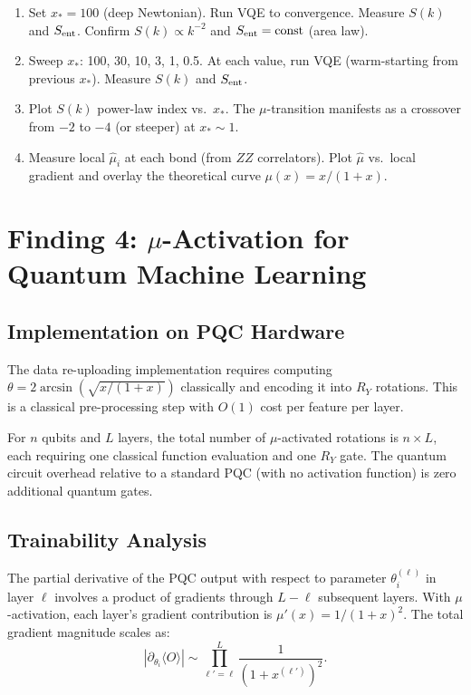 \documentclass[11pt]{article}
\theoremstyle{definition}
\theoremstyle{remark}
\begin{document}
\begin{enumerate}
\item Set $x_* = 100$ (deep Newtonian). Run VQE to convergence.
  Measure $S(k)$ and $S_{\rm ent}$. Confirm $S(k) \propto k^{-2}$
  and $S_{\rm ent} = {\rm const}$ (area law).

\item Sweep $x_*$: 100, 30, 10, 3, 1, 0.5. At each value, run VQE
  (warm-starting from previous $x_*$). Measure $S(k)$ and $S_{\rm ent}$.

\item Plot $S(k)$ power-law index vs.\ $x_*$. The $\mu$-transition
  manifests as a crossover from $-2$ to $-4$ (or steeper) at
  $x_* \sim 1$.

\item Measure local $\hat\mu_i$ at each bond (from $ZZ$ correlators).
  Plot $\hat\mu$ vs.\ local gradient and overlay the theoretical curve
  $\mu(x) = x/(1+x)$.
\end{enumerate}

\section{Finding 4: $\mu$-Activation for Quantum Machine Learning}
\label{sec:qml}

\subsection{Implementation on PQC Hardware}

The data re-uploading implementation requires computing
$\theta = 2\arcsin(\sqrt{x/(1+x)})$ classically and encoding
it into $R_Y$ rotations. This is a classical pre-processing step
with $O(1)$ cost per feature per layer.

For $n$ qubits and $L$ layers, the total number of $\mu$-activated
rotations is $n \times L$, each requiring one classical function
evaluation and one $R_Y$ gate. The quantum circuit overhead relative
to a standard PQC (with no activation function) is zero additional
quantum gates.

\subsection{Trainability Analysis}

The partial derivative of the PQC output with respect to parameter
$\theta_i^{(\ell)}$ in layer $\ell$ involves a product of gradients
through $L - \ell$ subsequent layers. With $\mu$-activation, each
layer's gradient contribution is $\mu'(x) = 1/(1+x)^2$. The total
gradient magnitude scales as:
\begin{equation}
  |\partial_{\theta_i} \langle O \rangle| \sim
  \prod_{\ell'=\ell}^{L} \frac{1}{(1 + x^{(\ell')})^2}.
\end{equation}
\end{document}
